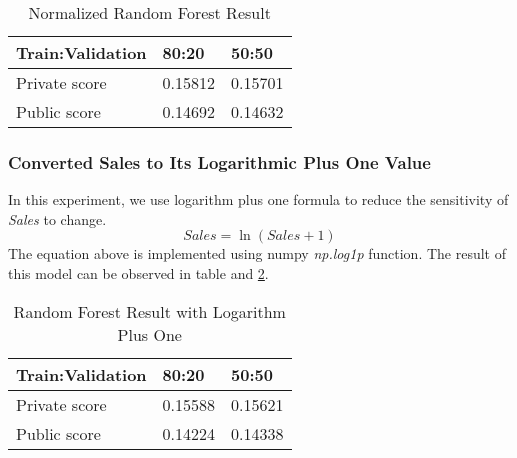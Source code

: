 \begin{table}[h]
	\centering
	\caption{Normalized Random Forest Result }
	\label{tab:random_forest_result_1}
	\begin{tabular}{|m{150pt}|m{50pt}|m{50pt}|}
		\hline
		\textbf{Train:Validation}& \textbf{80:20}& \textbf{50:50}  \\ \hline
		Private score & 0.15812 & 0.15701  \\ \hline
		Public score  & 0.14692 & 0.14632\\ \hline
	\end{tabular}
\end{table}

\subsubsection{Converted Sales to Its Logarithmic Plus One Value}
In this experiment, we use logarithm plus one formula to reduce the sensitivity of   \textit{Sales} to change.  
\begin{equation}
\label{eq:logarithm plus one}
Sales = \ln (Sales + 1)
\end{equation}
The equation above is implemented using numpy \textit{np.log1p} function.
The result of this model can be observed in table and \ref{tab:rf_log_2}.
\begin{table}[h]
	\centering
	\caption{Random Forest Result with Logarithm Plus One}
	\label{tab:rf_log_2}
	\begin{tabular}{|m{150pt}|m{50pt}|m{50pt}|}
		\hline
		\textbf{Train:Validation}&\textbf{80:20}&\textbf{50:50} \\ \hline
		Private score & 0.15588 & 0.15621 \\ \hline
		Public score  & 0.14224 & 0.14338 \\ \hline
	\end{tabular}
\end{table}



